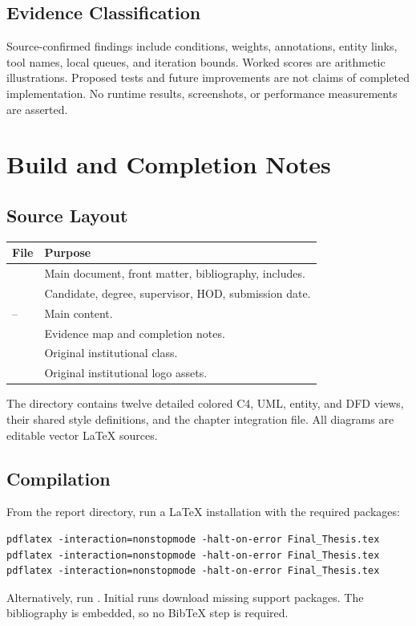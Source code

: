 \section{Evidence Classification}
Source-confirmed findings include conditions, weights, annotations, entity links, tool names, local queues, and iteration bounds. Worked scores are arithmetic illustrations. Proposed tests and future improvements are not claims of completed implementation. No runtime results, screenshots, or performance measurements are asserted.

\chapter{Build and Completion Notes}
\section{Source Layout}
\begin{tabularx}{\textwidth}{lY}\toprule File & Purpose\\\midrule
{} & Main document, front matter, bibliography, includes.\\
 & Candidate, degree, supervisor, HOD, submission date.\\
-- & Main content.\\
 & Evidence map and completion notes.\\
 & Original institutional class.\\
 & Original institutional logo assets.\\\bottomrule\end{tabularx}
\par\noindent The  directory contains twelve detailed colored C4, UML, entity, and DFD views, their shared style definitions, and the chapter integration file. All diagrams are editable vector LaTeX sources.

\clearpage\section{Compilation}
From the report directory, run a LaTeX installation with the required packages:
\par\noindent\begin{minipage}{\textwidth}
\begin{lstlisting}
pdflatex -interaction=nonstopmode -halt-on-error Final_Thesis.tex
pdflatex -interaction=nonstopmode -halt-on-error Final_Thesis.tex
pdflatex -interaction=nonstopmode -halt-on-error Final_Thesis.tex
\end{lstlisting}
\end{minipage}\par
Alternatively, run . Initial runs download missing support packages. The bibliography is embedded, so no BibTeX step is required.

